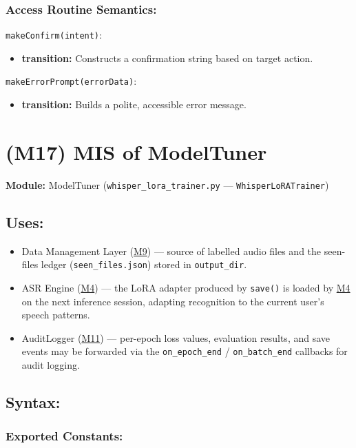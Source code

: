 \documentclass[12pt, titlepage]{article}
\begin{document}
\subsubsection{Access Routine Semantics:}

\noindent\texttt{makeConfirm(intent)}:
\begin{itemize}
\item \textbf{transition:} Constructs a confirmation string based on target action.
\end{itemize}

\noindent\texttt{makeErrorPrompt(errorData)}:
\begin{itemize}
\item \textbf{transition:} Builds a polite, accessible error message.
\end{itemize}

\label{MIS:M17}

\section{(M17) MIS of ModelTuner} \label{M17}

\textbf{Module:} ModelTuner (\texttt{whisper\_lora\_trainer.py} — \texttt{WhisperLoRATrainer})

\subsection{Uses:}
\begin{itemize}
  \item Data Management Layer (\hyperref[M9]{M9}) — source of labelled audio files and the seen-files ledger (\texttt{seen\_files.json}) stored in \texttt{output\_dir}.
  \item ASR Engine (\hyperref[M4]{M4}) — the LoRA adapter produced by \texttt{save()} is loaded by \hyperref[M4]{M4} on the next inference session, adapting recognition to the current user's speech patterns.
  \item AuditLogger (\hyperref[M11]{M11}) — per-epoch loss values, evaluation results, and save events may be forwarded via the \texttt{on\_epoch\_end} / \texttt{on\_batch\_end} callbacks for audit logging.
\end{itemize}

\subsection{Syntax:}

\subsubsection{Exported Constants:}
\end{document}
